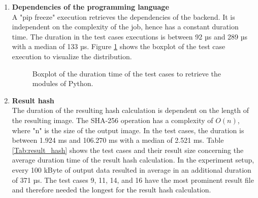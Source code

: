 \documentclass[draft,final]{vutinfth} %
\begin{document}
\begin{enumerate}
	\item \textbf{Dependencies of the programming language} \\
	A "pip freeze" execution retrieves the dependencies of the backend. It is independent on the complexity of the job, hence has a constant duration time. The duration in the test cases executions is between 92 µs and 289 µs with a median of 133 µs. Figure \ref{fig:evaluation_perf_python} shows the boxplot of the test case execution to visualize the distribution.
	\begin{figure}[!h]
		\centering
		\caption{Boxplot of the duration time of the test cases to retrieve the modules of Python.}
		\label{fig:evaluation_perf_python}		
	\end{figure}

	\item \textbf{Result hash} \\
	The duration of the resulting hash calculation is dependent on the length of the resulting image. The SHA-256 operation has a complexity of $O(n)$, where "n" is the size of the output image. In the test cases, the duration is between 1.924 ms and 106.270 ms with a median of 2.521 ms. Table \ref{Tab:result_hash} shows the test cases and their result size concerning the average duration time of the result hash calculation. In the experiment setup, every 100 kByte of output data resulted in average in an additional duration of 371 µs. The test cases 9, 11, 14, and 16 have the most prominent result file and therefore needed the longest for the result hash calculation.     
	

\end{enumerate}
\end{document}
